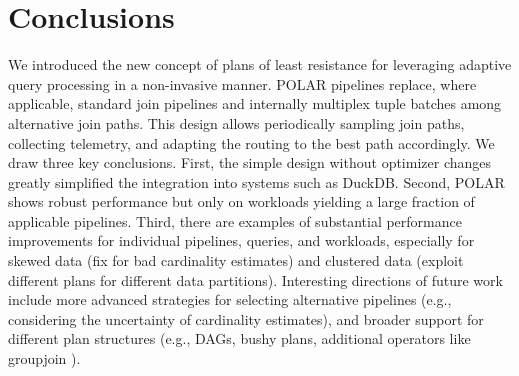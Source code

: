 \section{Conclusions}
We introduced the new concept of plans of least resistance for leveraging adaptive query processing in a non-invasive manner. POLAR pipelines replace, where applicable, standard join pipelines and internally multiplex tuple batches among alternative join paths. This design allows periodically sampling join paths, collecting telemetry, and adapting the routing to the best path accordingly. 
We draw three key conclusions. First, the simple design without optimizer changes greatly simplified the integration into systems such as DuckDB. Second, POLAR shows robust performance but only on workloads yielding a large fraction of applicable pipelines. Third, there are examples of substantial performance improvements for individual pipelines, queries, and workloads, especially for skewed data (fix for bad cardinality estimates) and clustered data (exploit different plans for different data partitions).
Interesting directions of future work include more advanced strategies for selecting alternative pipelines (e.g., considering the uncertainty of cardinality estimates), and broader support for different plan structures (e.g., DAGs, bushy plans, additional operators like groupjoin \cite{MoerkotteN11}). 
